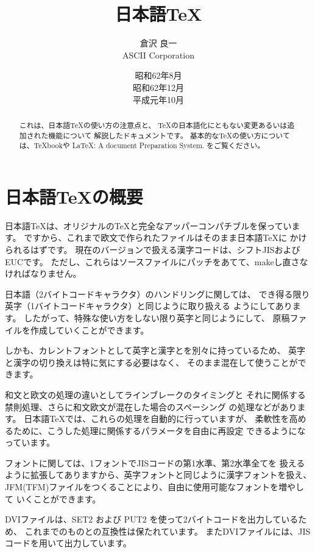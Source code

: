 ﻿\def\cs#1{$\backslash$\kern0pt#1}
\def\angle#1{$\langle$\kern0pt#1\kern0pt$\rangle$}

\title{日本語\TeX}
\author{倉沢 良一\\ASCII Corporation}
\date{昭和62年8月 \\ 昭和62年12月 \\ 平成元年10月}
\maketitle
\begin{abstract}
これは、日本語\TeX の使い方の注意点と、
\TeX の日本語化にともない変更あるいは追加された機能について
解説したドキュメントです。
基本的な\TeX の使い方については、\TeX bookや
\LaTeX: A document Preparation System. をご覧ください。
\end{abstract}

\section{日本語\TeX の概要}
日本語\TeX は、オリジナルの\TeX と完全なアッパーコンパチブルを保っています。
ですから、これまで欧文で作られたファイルはそのまま日本語\TeX に
かけられるはずです。
現在のバージョンで扱える漢字コードは、シフトJISおよびEUCです。
ただし、これらはソースファイルにパッチをあてて、makeし直さなければなりません。

日本語（2バイトコードキャラクタ）のハンドリングに関しては、
でき得る限り英字（1バイトコードキャラクタ）と同じように取り扱える
ようにしてあります。
したがって、特殊な使い方をしない限り英字と同じようにして、
原稿ファイルを作成していくことができます。

しかも、カレントフォントとして英字と漢字とを別々に持っているため、
英字と漢字の切り換えは特に気にする必要はなく、
そのまま混在して使うことができます。

和文と欧文の処理の違いとしてラインブレークのタイミングと
それに関係する禁則処理、さらに和文欧文が混在した場合のスペーシング
の処理などがあります。
日本語\TeX では、これらの処理を自動的に行っていますが、
柔軟性を高めるために、こうした処理に関係するパラメータを自由に再設定
できるようになっています。

フォントに関しては、1フォントでJISコードの第1水準、第2水準全てを
扱えるように拡張してありますから、英字フォントと同じように漢字フォントを扱え、
JFM(TFM)ファイルをつくることにより、自由に使用可能なフォントを増やして
いくことができます。

DVIファイルは、SET2 および PUT2 を使って2バイトコードを出力しているため、
これまでのものとの互換性は保たれています。
またDVIファイルには、JISコードを用いて出力しています。

